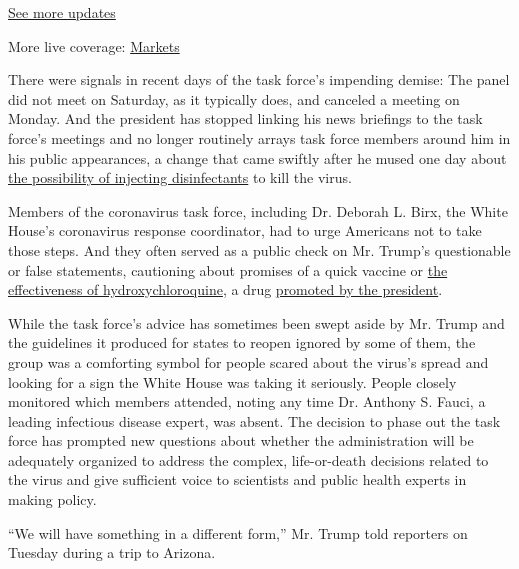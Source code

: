 \href{https://www.nytimes3xbfgragh.onion/2020/09/09/world/covid-19-coronavirus.html?action=click\&pgtype=Article\&state=default\&region=MAIN_CONTENT_1\&context=storylines_live_updates}{See
more updates}

More live coverage:
\href{https://www.nytimes3xbfgragh.onion/live/2020/09/09/business/stock-market-today-coronavirus?action=click\&pgtype=Article\&state=default\&region=MAIN_CONTENT_1\&context=storylines_live_updates}{Markets}

There were signals in recent days of the task force's impending demise:
The panel did not meet on Saturday, as it typically does, and canceled a
meeting on Monday. And the president has stopped linking his news
briefings to the task force's meetings and no longer routinely arrays
task force members around him in his public appearances, a change that
came swiftly after he mused one day about
\href{https://www.nytimes3xbfgragh.onion/2020/04/24/us/politics/trump-inject-disinfectant-bleach-coronavirus.html}{the
possibility of injecting disinfectants} to kill the virus.

Members of the coronavirus task force, including Dr. Deborah L. Birx,
the White House's coronavirus response coordinator, had to urge
Americans not to take those steps. And they often served as a public
check on Mr. Trump's questionable or false statements, cautioning about
promises of a quick vaccine or
\href{https://www.nytimes3xbfgragh.onion/2020/04/05/us/politics/trump-hydroxychloroquine-coronavirus.html}{the
effectiveness of hydroxychloroquine}, a drug
\href{https://www.nytimes3xbfgragh.onion/2020/04/22/business/media/virus-fox-news-hydroxychloroquine.html}{promoted
by the president}.

While the task force's advice has sometimes been swept aside by Mr.
Trump and the guidelines it produced for states to reopen ignored by
some of them, the group was a comforting symbol for people scared about
the virus's spread and looking for a sign the White House was taking it
seriously. People closely monitored which members attended, noting any
time Dr. Anthony S. Fauci, a leading infectious disease expert, was
absent. The decision to phase out the task force has prompted new
questions about whether the administration will be adequately organized
to address the complex, life-or-death decisions related to the virus and
give sufficient voice to scientists and public health experts in making
policy.

``We will have something in a different form,'' Mr. Trump told reporters
on Tuesday during a trip to Arizona.

